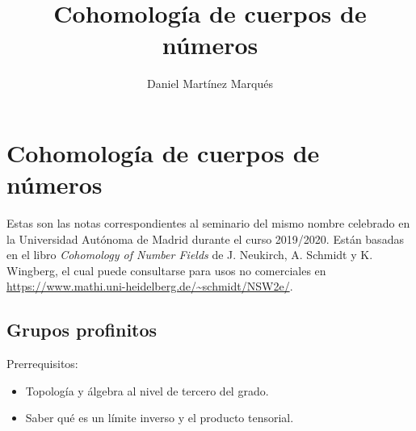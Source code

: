 \documentclass[a4paper,12pt, leqno]{report}
\title{Cohomología de cuerpos de números}
\author{Daniel Martínez Marqués}
\begin{document}
\chapter*{Cohomología de cuerpos de números}

Estas son las notas correspondientes al seminario del mismo nombre celebrado en la Universidad Autónoma de Madrid durante el curso 2019/2020. Están basadas en el libro \textit{Cohomology of Number Fields} de J. Neukirch, A. Schmidt y K. Wingberg, el cual puede consultarse para usos no comerciales en \url{https://www.mathi.uni-heidelberg.de/~schmidt/NSW2e/}. 
\begin{center}
\cc \ccby \ccnc
\end{center}
\section*{Grupos profinitos}

Prerrequisitos:

\begin{itemize}
	\item Topología y álgebra al nivel de tercero del grado.
	\item Saber qué es un límite inverso y el producto tensorial.
\end{itemize}
\end{document}
